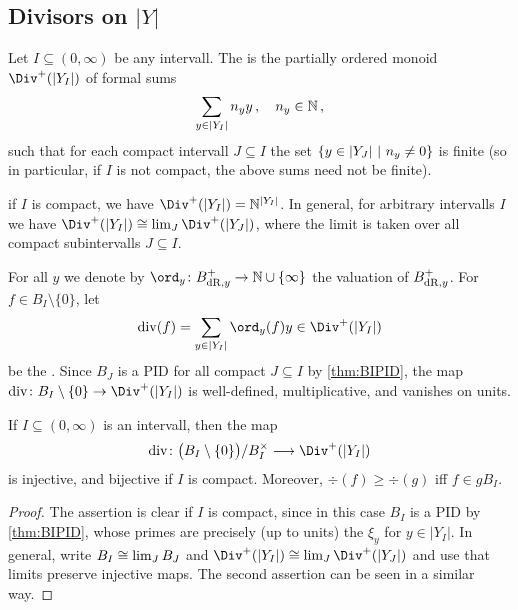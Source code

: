 \documentclass[a4paper, 10pt, oneside, DIV=9, chapterprefix=true, numbers=enddot,bibliography=totoc]{scrbook}
\begin{document}
\subsection{Divisors on \texorpdfstring{$|Y|$}{|Y|}}
\begin{defi}
	Let $I\subseteq (0,\infty)$ be any intervall. The  is the partially ordered monoid $\Div^+(|Y_I|)$ of formal sums
	\begin{equation*}
		\sum_{y\in|Y_I|}n_yy\,,\quad n_y\in\mathbb{N}\,,
	\end{equation*}
	such that for each compact intervall $J\subseteq I$ the set $\left\{y\in|Y_J|\ \middle|\  n_y\neq 0\right\}$ is finite (so in particular, if $I$ is not compact, the above sums need not be finite).
\end{defi}
\begin{exm}
	if $I$ is compact, we have $\Div^+(|Y_I|)=\IN^{|Y_I|}$. In general, for arbitrary intervalls $I$ we have $\Div^+(|Y_I|)\cong \limit_{J}\Div^+(|Y_J|)$, where the limit is taken over all compact subintervalls $J\subseteq I$.
\end{exm}
\begin{defi}\label{def:div}
	For all $y$ we denote by $\ord_y\colon B_{\dR,y}^+\morphism \IN\cup\{\infty\}$ the valuation of $B_{\mathrm{dR},y}^+$. For $f\in B_I\setminus\{0\}$, let
	\begin{equation*}
		\div(f)=\sum_{y\in|Y_I|}\ord_y(f)y\in \Div^+(|Y_I|)
	\end{equation*}
	be the . Since $B_J$ is a PID for all compact $J\subseteq I$ by \cref{thm:BIPID}, the map $\div\colon B_I\setminus\{0\}\morphism \Div^+(|Y_I|)$ is well-defined, multiplicative, and vanishes on units.
\end{defi}
\begin{prop}\label{prop:divInjective}
	If $I\subseteq (0,\infty)$ is an intervall, then the map
	\begin{equation*}
		\div\colon \big(B_I\setminus\{0\}\big)/B_I^\times\morphism \Div^+(|Y_I|)
	\end{equation*}
	is injective, and bijective if $I$ is compact. Moreover, $\div(f)\geq \div(g)$ iff $f\in gB_I$.
\end{prop}
\begin{proof}
	The assertion is clear if $I$ is compact, since in this case $B_I$ is a PID by \cref{thm:BIPID}, whose primes are precisely (up to units) the $\xi_y$ for $y\in |Y_I|$. In general, write $B_I\cong\operatorname*{lim}_JB_J$ and $\Div^+(|Y_I|)\cong \limit_J\Div^+(|Y_J|)$ and use that limits preserve injective maps. The second assertion can be seen in a similar way.
\end{proof}
\end{document}
